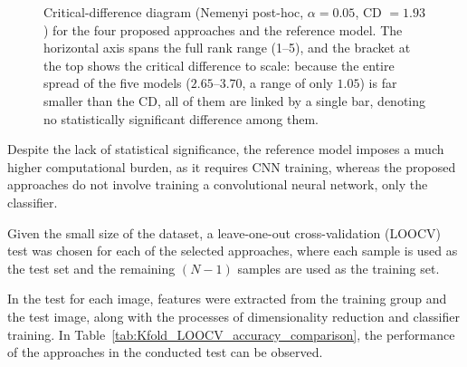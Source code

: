\documentclass[final,5p,times,twocolumn]{elsarticle}
\begin{document}
\begin{figure}[h!]
	\centering
	\caption{Critical-difference diagram (Nemenyi post-hoc, $\alpha=0.05$, CD $=1.93$) for the four proposed approaches and the reference model. The horizontal axis spans the full rank range (1--5), and the bracket at the top shows the critical difference to scale: because the entire spread of the five models ($2.65$--$3.70$, a range of only $1.05$) is far smaller than the CD, all of them are linked by a single bar, denoting no statistically significant difference among them.} \label{fig:cd}
\end{figure}

Despite the lack of statistical significance, the reference model imposes a much higher computational burden, as it requires CNN training, whereas the proposed approaches do not involve training a convolutional neural network, only the classifier.

Given the small size of the dataset, a leave-one-out cross-validation (LOOCV) test was chosen for each of the selected approaches, where each sample is used as the test set and the remaining $(N-1)$ samples are used as the training set.

In the test for each image, features were extracted from the training group and the test image, along with the processes of dimensionality reduction and classifier training. In Table~\ref{tab:Kfold_LOOCV_accuracy_comparison}, the performance of the approaches in the conducted test can be observed.
\end{document}
